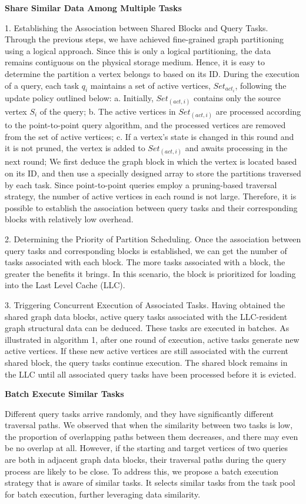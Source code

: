 \documentclass[lettersize,journal]{IEEEtran} %
\begin{document}
{\bf{Share Similar Data Among Multiple Tasks}}

1. Establishing the Association between Shared Blocks and Query Tasks. Through the previous steps, we have achieved fine-grained graph partitioning using a logical approach. Since this is only a logical partitioning, the data remains contiguous on the physical storage medium. Hence, it is easy to determine the partition a vertex belongs to based on its ID. During the execution of a query, each task $q_i$ maintains a set of active vertices, $Set_{act_i}$, following the update policy outlined below:
a. Initially, $Set_(act,i)$ contains only the source vertex $S_i$ of the query;
b. The active vertices in $Set_(act,i)$ are processed according to the point-to-point query algorithm, and the processed vertices are removed from the set of active vertices;
c. If a vertex's state is changed in this round and it is not pruned, the vertex is added to $Set_(act,i)$ and awaits processing in the next round;
We first deduce the graph block in which the vertex is located based on its ID, and then use a specially designed array to store the partitions traversed by each task. Since point-to-point queries employ a pruning-based traversal strategy, the number of active vertices in each round is not large. Therefore, it is possible to establish the association between query tasks and their corresponding blocks with relatively low overhead.

2. Determining the Priority of Partition Scheduling. Once the association between query tasks and corresponding blocks is established, we can get the number of tasks associated with each block. The more tasks associated with a block, the greater the benefits it brings. In this scenario, the block is prioritized for loading into the Last Level Cache (LLC).

3. Triggering Concurrent Execution of Associated Tasks. Having obtained the shared graph data blocks, active query tasks associated with the LLC-resident graph structural data can be deduced. These tasks are executed in batches. As illustrated in algorithm 1, after one round of execution, active tasks generate new active vertices. If these new active vertices are still associated with the current shared block, the query tasks continue execution. The shared block remains in the LLC until all associated query tasks have been processed before it is evicted.

{\bf{Batch Execute Similar Tasks}}

Different query tasks arrive randomly, and they have significantly different traversal paths. We observed that when the similarity between two tasks is low, the proportion of overlapping paths between them decreases, and there may even be no overlap at all. However, if the starting and target vertices of two queries are both in adjacent graph data blocks, their traversal paths during the query process are likely to be close. To address this, we propose a batch execution strategy that is aware of similar tasks. It selects similar tasks from the task pool for batch execution, further leveraging data similarity.
\end{document}
